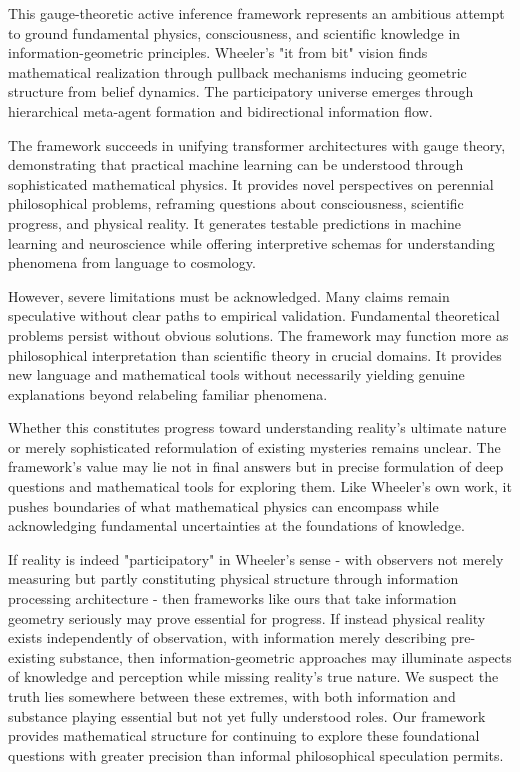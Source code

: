 \documentclass[11pt]{article}
\begin{document}
This gauge-theoretic active inference framework represents an ambitious attempt to ground fundamental physics, consciousness, and scientific knowledge in information-geometric principles. Wheeler's "it from bit" vision finds mathematical realization through pullback mechanisms inducing geometric structure from belief dynamics. The participatory universe emerges through hierarchical meta-agent formation and bidirectional information flow.

The framework succeeds in unifying transformer architectures with gauge theory, demonstrating that practical machine learning can be understood through sophisticated mathematical physics. It provides novel perspectives on perennial philosophical problems, reframing questions about consciousness, scientific progress, and physical reality. It generates testable predictions in machine learning and neuroscience while offering interpretive schemas for understanding phenomena from language to cosmology.

However, severe limitations must be acknowledged. Many claims remain speculative without clear paths to empirical validation. Fundamental theoretical problems persist without obvious solutions. The framework may function more as philosophical interpretation than scientific theory in crucial domains. It provides new language and mathematical tools without necessarily yielding genuine explanations beyond relabeling familiar phenomena.

Whether this constitutes progress toward understanding reality's ultimate nature or merely sophisticated reformulation of existing mysteries remains unclear. The framework's value may lie not in final answers but in precise formulation of deep questions and mathematical tools for exploring them. Like Wheeler's own work, it pushes boundaries of what mathematical physics can encompass while acknowledging fundamental uncertainties at the foundations of knowledge.

If reality is indeed "participatory" in Wheeler's sense - with observers not merely measuring but partly constituting physical structure through information processing architecture - then frameworks like ours that take information geometry seriously may prove essential for progress. If instead physical reality exists independently of observation, with information merely describing pre-existing substance, then information-geometric approaches may illuminate aspects of knowledge and perception while missing reality's true nature. We suspect the truth lies somewhere between these extremes, with both information and substance playing essential but not yet fully understood roles. Our framework provides mathematical structure for continuing to explore these foundational questions with greater precision than informal philosophical speculation permits.
\end{document}
